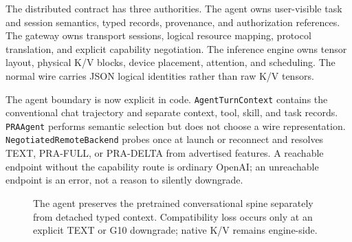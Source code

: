 \documentclass[11pt]{article}
\begin{document}
The distributed contract has three authorities. The agent owns user-visible
task and session semantics, typed records, provenance, and authorization
references. The gateway owns transport sessions, logical resource mapping,
protocol translation, and explicit capability negotiation. The inference
engine owns tensor layout, physical K/V blocks, device placement, attention,
and scheduling. The normal wire carries JSON logical identities rather than
raw K/V tensors.

The agent boundary is now explicit in code. \texttt{AgentTurnContext} contains
the conventional chat trajectory and separate context, tool, skill, and task
records. \texttt{PRAAgent} performs semantic selection but does not choose a
wire representation. \texttt{NegotiatedRemoteBackend} probes
 once at launch or reconnect and resolves TEXT,
PRA-FULL, or PRA-DELTA from advertised features. A reachable endpoint without
the capability route is ordinary OpenAI; an unreachable endpoint is an error,
not a reason to silently downgrade.

\begin{figure}[H]
\centering
{}
\caption{The agent preserves the pretrained conversational spine separately
from detached typed context. Compatibility loss occurs only at an explicit
TEXT or G10 downgrade; native K/V remains engine-side.}
\label{fig:agent-transport}
\end{figure}
\end{document}

